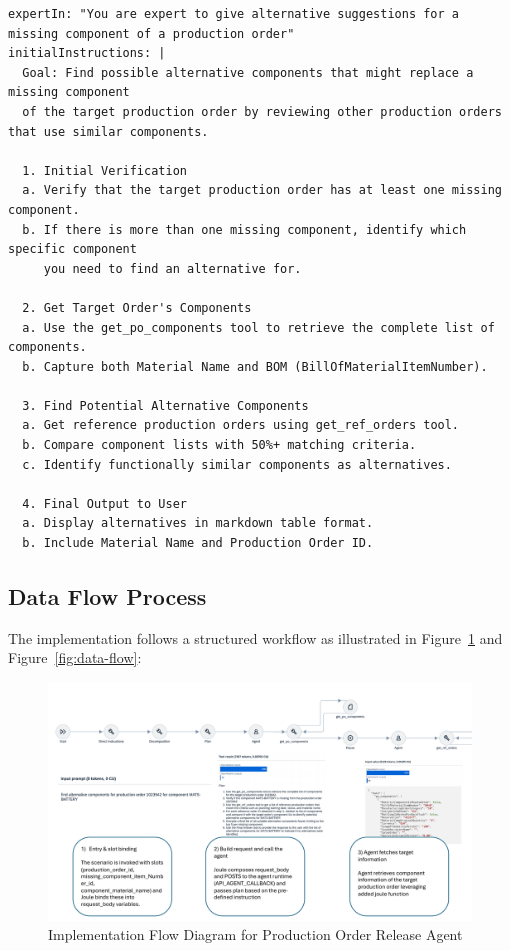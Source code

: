 \begin{verbatim}
expertIn: "You are expert to give alternative suggestions for a missing component of a production order"
initialInstructions: |
  Goal: Find possible alternative components that might replace a missing component 
  of the target production order by reviewing other production orders that use similar components.
  
  1. Initial Verification
  a. Verify that the target production order has at least one missing component.
  b. If there is more than one missing component, identify which specific component 
     you need to find an alternative for.
  
  2. Get Target Order's Components
  a. Use the get_po_components tool to retrieve the complete list of components.
  b. Capture both Material Name and BOM (BillOfMaterialItemNumber).
  
  3. Find Potential Alternative Components
  a. Get reference production orders using get_ref_orders tool.
  b. Compare component lists with 50%+ matching criteria.
  c. Identify functionally similar components as alternatives.
  
  4. Final Output to User
  a. Display alternatives in markdown table format.
  b. Include Material Name and Production Order ID.
\end{verbatim}

\subsection{Data Flow Process}

The implementation follows a structured workflow as illustrated in Figure~\ref{fig:implementation-flow} and Figure~\ref{fig:data-flow}:

\begin{figure}[h]
    \centering
    \includegraphics[width=1.0\textwidth]{graphic/flow-1.pdf}
    \caption{Implementation Flow Diagram for Production Order Release Agent}
    \label{fig:implementation-flow}
    \end{figure}
    
